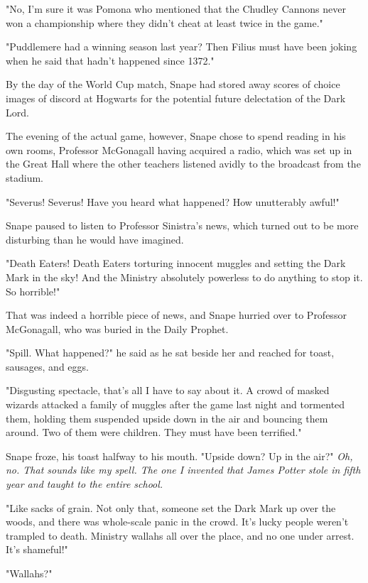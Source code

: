 "No, I'm sure it was Pomona who mentioned that the Chudley Cannons never won a championship where they didn't cheat at least twice in the game."

"Puddlemere had a winning season last year? Then Filius must have been joking when he said that hadn't happened since 1372."

By the day of the World Cup match, Snape had stored away scores of choice images of discord at Hogwarts for the potential future delectation of the Dark Lord.

The evening of the actual game, however, Snape chose to spend reading in his own rooms, Professor McGonagall having acquired a radio, which was set up in the Great Hall where the other teachers listened avidly to the broadcast from the stadium.

\sbreak

"Severus! Severus! Have you heard what happened? How unutterably awful!"

Snape paused to listen to Professor Sinistra's news, which turned out to be more disturbing than he would have imagined.

"Death Eaters! Death Eaters torturing innocent muggles and setting the Dark Mark in the sky! And the Ministry absolutely powerless to do anything to stop it. So horrible!"

That was indeed a horrible piece of news, and Snape hurried over to Professor McGonagall, who was buried in the Daily Prophet.

"Spill. What happened?" he said as he sat beside her and reached for toast, sausages, and eggs.

"Disgusting spectacle, that's all I have to say about it. A crowd of masked wizards attacked a family of muggles after the game last night and tormented them, holding them suspended upside down in the air and bouncing them around. Two of them were children. They must have been terrified."

Snape froze, his toast halfway to his mouth. "Upside down? Up in the air?" \emph{Oh, no. That sounds like my spell. The one I invented that James Potter stole in fifth year and taught to the entire school.}

"Like sacks of grain. Not only that, someone set the Dark Mark up over the woods, and there was whole-scale panic in the crowd. It's lucky people weren't trampled to death. Ministry wallahs all over the place, and no one under arrest. It's shameful!"

"Wallahs?"

